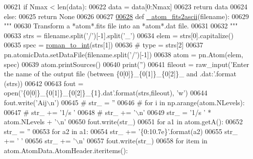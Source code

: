 \begin{DoxyCode}
00621             \textcolor{keywordflow}{if} Nmax < len(data):
00622                 data = data[0:Nmax]
00623         \textcolor{keywordflow}{return} data
00624     \textcolor{keywordflow}{else}:
00625         \textcolor{keywordflow}{return} \textcolor{keywordtype}{None}
00626     
00627     
\hypertarget{manage__atomic__data_8py_source_l00628}{}\hyperlink{namespacepyneb_1_1utils_1_1manage__atomic__data_a3e35c0ac9cfe657a18cb4a1a797edf32}{00628} \textcolor{keyword}{def }\hyperlink{namespacepyneb_1_1utils_1_1manage__atomic__data_a3e35c0ac9cfe657a18cb4a1a797edf32}{\_atom\_fits2ascii}(filename):
00629     \textcolor{stringliteral}{"""}
00630 \textcolor{stringliteral}{    Transform a *atom*.fits file into an *atom*.dat file.}
00631 \textcolor{stringliteral}{    }
00632 \textcolor{stringliteral}{    """}
00633     strs = filename.split(\textcolor{stringliteral}{'/'})[-1].split(\textcolor{stringliteral}{'\_'})
00634     elem = strs[0].capitalize()
00635     spec = \hyperlink{namespacepyneb_1_1utils_1_1misc_a97329c3ce57bd870421672b90e3e6541}{roman\_to\_int}(strs[1])
00636 \textcolor{comment}{#    type = strs[2]}
00637     pn.atomicData.setDataFile(filename.split(\textcolor{stringliteral}{'/'})[-1])
00638     atom = pn.Atom(elem, spec)
00639     atom.printSources()
00640     print(\textcolor{stringliteral}{''})
00641     fileout = raw\_input(\textcolor{stringliteral}{'Enter the name of the output file (between \{0[0]\}\_\{0[1]\}\_\{0[2]\}\_ and .dat:'}.format
      (strs))
00642     
00643     fout = open(\textcolor{stringliteral}{'\{0[0]\}\_\{0[1]\}\_\{0[2]\}\_\{1\}.dat'}.format(strs,fileout), \textcolor{stringliteral}{'w'})
00644     fout.write(\textcolor{stringliteral}{'Aij\(\backslash\)n'})
00645 \textcolor{comment}{#    str\_ = ''}
00646 \textcolor{comment}{#    for i in np.arange(atom.NLevels):}
00647 \textcolor{comment}{#        str\_ += '1/s '}
00648 \textcolor{comment}{#    str\_ += '\(\backslash\)n'}
00649     str\_ = \textcolor{stringliteral}{'1/s '} * atom.NLevels + \textcolor{stringliteral}{'\(\backslash\)n'}
00650     fout.write(str\_)
00651     \textcolor{keywordflow}{for} a1 \textcolor{keywordflow}{in} atom.getA():
00652         str\_ = \textcolor{stringliteral}{''}
00653         \textcolor{keywordflow}{for} a2 \textcolor{keywordflow}{in} a1:
00654             str\_ += \textcolor{stringliteral}{'\{0:10.7e\}'}.format(a2)
00655             str\_ += \textcolor{stringliteral}{' '}
00656         str\_ += \textcolor{stringliteral}{'\(\backslash\)n'}
00657         fout.write(str\_)
00658     \textcolor{keywordflow}{for} item \textcolor{keywordflow}{in} atom.AtomData.AtomHeader.iteritems():

\end{DoxyCode}
